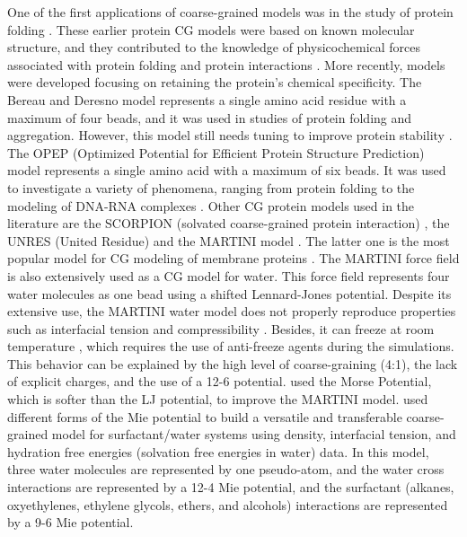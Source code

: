 One of the first applications of coarse-grained models was in the study of protein folding \cite{levitt1975,levitt1976}. These earlier protein CG models were based on known molecular structure, and they contributed to the knowledge of physicochemical forces associated with protein folding and protein interactions \cite{koga2001}.  More recently, models were developed focusing on retaining the protein's chemical specificity. The Bereau and Deresno model \cite{bereau2009} represents a single amino acid residue with a maximum of four beads, and it was used in studies of protein folding and aggregation. However, this model still needs tuning to improve protein stability \cite{bereau2010}. The OPEP (Optimized Potential for Efficient Protein Structure Prediction) model \cite{opep2014,opep2015} represents a single amino acid with a maximum of six beads. It was used to investigate a variety of phenomena, ranging from protein folding to the modeling of DNA-RNA complexes \cite{opep2011,opep2009,opep2014}. Other CG protein models used in the literature are the SCORPION (solvated coarse-grained protein interaction)  \cite{scorpion2013}, the UNRES (United Residue) \cite{unres2014} and the MARTINI model \cite{martini2013}. The latter one is the most popular model for CG modeling of membrane proteins \cite{martini20132}. The MARTINI force field is also extensively used as a CG model for water. This force field represents four water molecules as one bead using a shifted Lennard-Jones potential. Despite its extensive use, the MARTINI water model does not properly reproduce properties such as interfacial tension and compressibility \cite{shinoda2010}. Besides, it can freeze at room temperature \cite{winger2009,martini2007}, which requires the use of anti-freeze agents during the simulations. This behavior can be explained by the high level of coarse-graining (4:1), the lack of explicit charges, and the use of a 12-6 potential.  used the Morse Potential, which is softer than the LJ potential, to improve the MARTINI model.  used different forms of the Mie potential to build a versatile and transferable coarse-grained model for surfactant/water systems using density, interfacial tension, and hydration free energies (solvation free energies in water) data. In this model, three water molecules are represented by one pseudo-atom, and the water cross interactions are represented by a 12-4 Mie potential, and the surfactant (alkanes, oxyethylenes, ethylene glycols, ethers, and alcohols) interactions are represented by a 9-6 Mie potential. 

